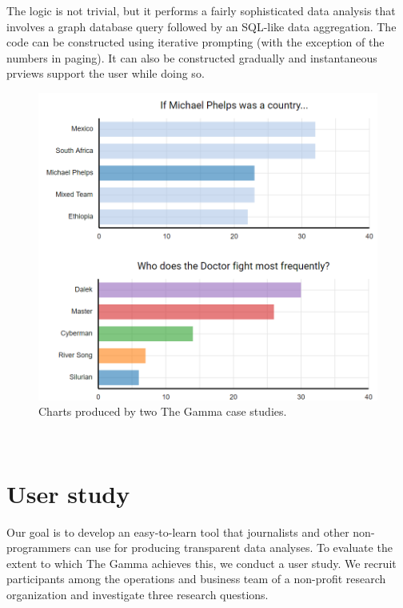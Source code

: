\documentclass{sigchi}
\begin{document}
The logic is not trivial, but it performs a fairly sophisticated data analysis that involves a
graph database query followed by an SQL-like data aggregation. The code can be constructed
using iterative prompting (with the exception of the numbers in paging). It can also be constructed
gradually and instantaneous prviews support the user while doing so.

\newpage


\begin{figure}
\centering
\includegraphics[width=1\columnwidth]{figures/cases}
\caption{Charts produced by two The Gamma case studies.}
\label{fig:cases}
\end{figure}

~
\newpage


\section{User study}
\label{sec:study}

Our goal is to develop an easy-to-learn tool that journalists and other non-programmers can use
for producing transparent data analyses. To evaluate the extent to which The Gamma achieves this,
we conduct a user study. We recruit participants among the operations and business team of a
non-profit research organization and investigate three research questions.
\end{document}
